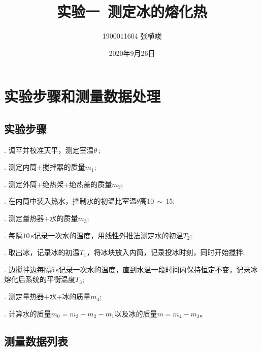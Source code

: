 \documentclass{ctexart}
\begin{document}
\title{\textbf{实验一\ 测定冰的熔化热}}
\author{1900011604 张植竣}
\date{2020年9月26日}

\maketitle

\section{实验步骤和测量数据处理}

\subsection{实验步骤}

. 调平并校准天平，测定室温$\theta\,$;

. 测定内筒+搅拌器的质量$m_1$;

. 测定外筒+绝热架+绝热盖的质量$m_2$;

. 在内筒中装入热水，控制水的初温比室温$\theta$高10$\,\sim\,$15\textcelsius;

. 测定量热器+水的质量$m_3$;

. 每隔$10\,\mathrm{s}$记录一次水的温度，用线性外推法测定水的初温$T_2$;

. 取出冰，记录冰的初温$T_1$，将冰块放入内筒，记录投冰时刻，同时开始搅拌;

. 边搅拌边每隔$5\,\mathrm{s}$记录一次水的温度，直到水温一段时间内保持恒定不变，记录冰熔化后系统的平衡温度$T_3$;

. 测定量热器+水+冰的质量$m_4$;

. 计算水的质量$m_0 = m_3 - m_2 - m_1$以及冰的质量$m = m_4 - m_3$。

\subsection{测量数据列表}
\end{document}
